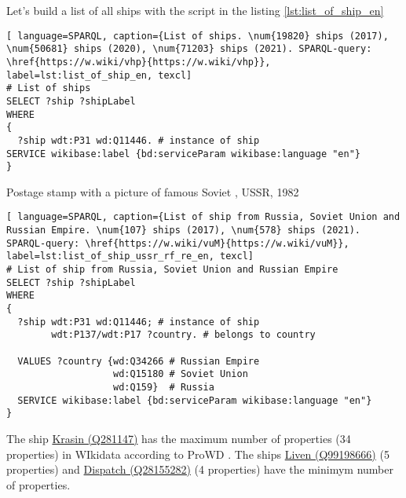 Let's build a list of all ships with the script in the listing \ref{lst:list_of_ship_en}


\begin{lstlisting}[ language=SPARQL, caption={List of ships. \num{19820} ships (2017), \num{50681} ships (2020), \num{71203} ships (2021). SPARQL-query: \href{https://w.wiki/vhp}{https://w.wiki/vhp}}, label=lst:list_of_ship_en, texcl]
# List of ships
SELECT ?ship ?shipLabel
WHERE
{
  ?ship wdt:P31 wd:Q11446. # instance of ship
SERVICE wikibase:label {bd:serviceParam wikibase:language "en"}
}
\end{lstlisting}


\begin{marginfigure}[0.0cm]
  {
    \setlength{\fboxsep}{0pt}%
    \setlength{\fboxrule}{1pt}%
  }
  \caption[Soviet destroyer project 7]{Postage stamp with a picture of famous Soviet , USSR, 1982}%
  \label{fig:quiz_question_ship}%
\end{marginfigure}
  
\begin{lstlisting}[ language=SPARQL, caption={List of ship from Russia, Soviet Union and Russian Empire. \num{107} ships (2017), \num{578} ships (2021). SPARQL-query: \href{https://w.wiki/vuM}{https://w.wiki/vuM}}, label=lst:list_of_ship_ussr_rf_re_en, texcl]
# List of ship from Russia, Soviet Union and Russian Empire
SELECT ?ship ?shipLabel
WHERE
{
  ?ship wdt:P31 wd:Q11446; # instance of ship
        wdt:P137/wdt:P17 ?country. # belongs to country
    
  VALUES ?country {wd:Q34266 # Russian Empire
                   wd:Q15180 # Soviet Union
                   wd:Q159}  # Russia
  SERVICE wikibase:label {bd:serviceParam wikibase:language "en"}
}
\end{lstlisting}

\label{question:ship_1}

The ship \href{https://www.wikidata.org/wiki/Q281147}{Krasin (Q281147)} has the maximum number of properties (34 properties) in WIkidata according to ProWD . The ships \href{https://www.wikidata.org/wiki/Q99198666}{Liven (Q99198666)} (5 properties) and \href{https://www.wikidata.org/wiki/Q28155282}{Dispatch (Q28155282)} (4 properties) have the minimym number of properties.


